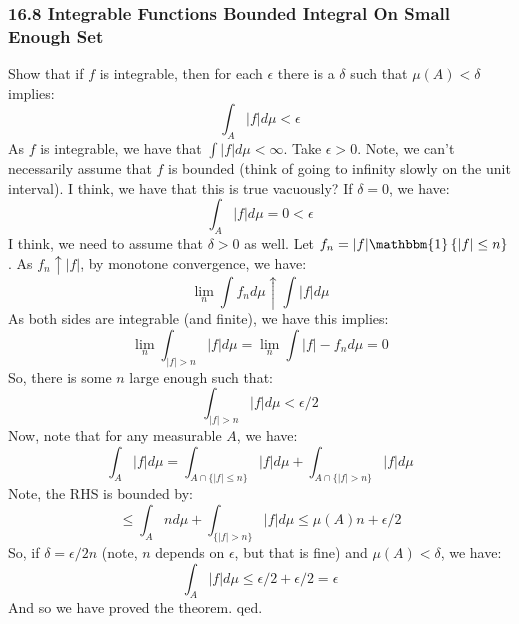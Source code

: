 \documentclass[12pt,a4paper]{article}
\newcommand{\1}[1]{\mathbbm{1}\left\{ #1 \right\}}
\begin{document}
\subsubsection{16.8 Integrable Functions Bounded Integral On Small Enough Set} Show that if $f$ is integrable, then for each $\epsilon$ there is a $\delta$ such that $\mu(A) < \delta$ implies:
$$
	\int_A |f| d\mu < \epsilon
$$
As $f$ is integrable, we have that $\int |f| d\mu < \infty$. Take $\epsilon > 0$. Note, we can't necessarily assume that $f$ is bounded (think of going to infinity slowly on the unit interval). I think, we have that this is true vacuously? If $\delta = 0$, we have:
$$
	\int_A |f| d\mu = 0 < \epsilon
$$
I think, we need to assume that $\delta > 0$ as well. Let $f_n = |f|\1{|f| \leq n}$. As $f_n \uparrow |f|$, by monotone convergence, we have:
$$
	\lim_n \int f_n d\mu \uparrow \int |f| d\mu
$$
As both sides are integrable (and finite), we have this implies:
$$
	\lim_n \int_{|f| > n} |f| d\mu = \lim_n \int |f| - f_n d\mu = 0
$$
So, there is some $n$ large enough such that:
$$
	\int_{|f| > n} |f| d\mu < \epsilon/2
$$
Now, note that for any measurable $A$, we have:
$$
	\int_A |f| d\mu = \int_{A \cap \{|f| \leq n\}} |f| d\mu + \int_{A \cap \{|f| > n\}} |f| d\mu
$$
Note, the RHS is bounded by:
$$
	\leq \int_A n d\mu + \int_{\{|f| > n\}} |f| d\mu \leq \mu(A)n + \epsilon/2
$$
So, if $\delta = \epsilon/2n$ (note, $n$ depends on $\epsilon$, but that is fine) and $\mu(A) < \delta$, we have:
$$
	\int_A |f| d\mu \leq \epsilon/2 + \epsilon/2 = \epsilon
$$
And so we have proved the theorem. qed.
\end{document}
